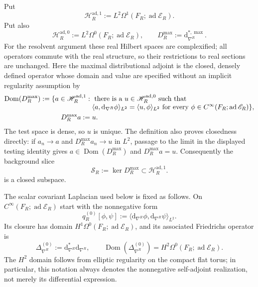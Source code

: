 Put
\[
 \mathscr H_R^{\mathrm{ad},1}
 :=L^2\Omega^1(F_R;\operatorname{ad}\mathscr E_R).
\]
Put also
\[
 \mathscr H_R^{\mathrm{ad},0}
 :=L^2\Omega^0(F_R;\operatorname{ad}\mathscr E_R),
 \qquad
 D_R^{\max}:=\mathrm d_{\nabla^R}^{*,\max}.
\]
For the resolvent argument these real Hilbert spaces are complexified;
all operators commute with the real structure, so their restrictions to
real sections are unchanged.
Here the maximal distributional adjoint is the closed, densely defined
operator whose domain and value are specified without an implicit
regularity assumption by
\begin{align}
 \operatorname{Dom}(D_R^{\max})
 :=\{a\in\mathscr H_R^{\mathrm{ad},1}:{}&\text{ there is a }u\in
 \mathscr H_R^{\mathrm{ad},0}\text{ such that}\notag\\[-1mm]
 &\langle a,\mathrm d_{\nabla^R}\phi\rangle_{L^2}
 =\langle u,\phi\rangle_{L^2}
 \text{ for every }\phi\in
 C^\infty(F_R;\operatorname{ad}\mathscr E_R)\},
 \label{cusp-magnetic-maximal-codifferential-domain}\\
 D_R^{\max}a:={}&u.\notag
\end{align}
The test space is dense, so \(u\) is unique.  The definition also proves
closedness directly: if \(a_n\to a\) and \(D_R^{\max}a_n\to u\) in
\(L^2\), passage to the limit in the displayed testing identity gives
\(a\in\operatorname{Dom}(D_R^{\max})\) and \(D_R^{\max}a=u\).
Consequently the background slice
\begin{equation}
 \mathscr S_R
 :=\ker D_R^{\max}
 \subset\mathscr H_R^{\mathrm{ad},1}.
 \label{cusp-magnetic-closed-background-slice}
\end{equation}
is a closed subspace.

The scalar covariant Laplacian used below is fixed as follows.  On
\(C^\infty(F_R;\operatorname{ad}\mathscr E_R)\) start with the
nonnegative form
\[
 q_R^{(0)}[\phi,\psi]
 :=\langle\mathrm d_{\nabla^R}\phi,
             \mathrm d_{\nabla^R}\psi\rangle_{L^2}.
\]
Its closure has domain
\(H^1\Omega^0(F_R;\operatorname{ad}\mathscr E_R)\), and its associated
Friedrichs operator is
\begin{equation}
 \Delta_{\nabla^R}^{(0)}
 :=\mathrm d_{\nabla^R}^*\mathrm d_{\nabla^R},
 \qquad
 \operatorname{Dom}(\Delta_{\nabla^R}^{(0)})
 =H^2\Omega^0(F_R;\operatorname{ad}\mathscr E_R).
 \label{cusp-magnetic-scalar-covariant-laplacian-domain}
\end{equation}
The \(H^2\) domain follows from elliptic regularity on the compact flat
torus; in particular, this notation always denotes the nonnegative
self-adjoint realization, not merely its differential expression.

